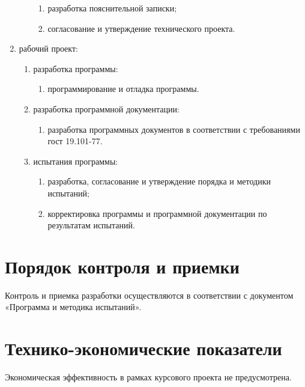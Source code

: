 \documentclass{../TechDoc}
\begin{document}
\begin{enumerate}
\begin{enumerate}
        \begin{enumerate}
            \item разработка пояснительной записки; 
            \item согласование и утверждение технического проекта. 
        \end{enumerate}
    \end{enumerate}
    \item рабочий проект:
    \begin{enumerate}
        \item разработка программы:
        \begin{enumerate}
            \item программирование и отладка программы. 
        \end{enumerate}
        \item разработка программной документации:
        \begin{enumerate}
            \item разработка программных документов в соответствии с требованиями гост 19.101-77. 
        \end{enumerate}
        \item испытания программы:
        \begin{enumerate}
            \item разработка, согласование и утверждение порядка и методики испытаний; 
            \item корректировка программы и программной документации по результатам испытаний.
        \end{enumerate}
    \end{enumerate}
    \end{enumerate}

    \section{Порядок контроля и приемки}
    
    Контроль и приемка разработки осуществляются в соответствии с документом «Программа и методика испытаний».
    
    \section{Технико-экономические показатели}
    
    Экономическая эффективность в рамках курсового проекта не предусмотрена.
        
    \registrationList
        
\end{document}
